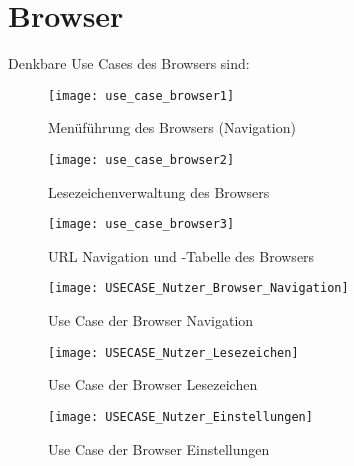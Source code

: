 \author{Gottfried von Recum}

\section{Browser}

Denkbare Use Cases des Browsers sind:
\begin{figure}[h]
	\centering
	\texttt{[image: use\_case\_browser1]}
	\caption{Menüführung des Browsers (Navigation)}
	\label{fig:Browser Navigation}
\end{figure}
\begin{figure}[h]
	\centering
	\texttt{[image: use\_case\_browser2]}
	\caption{Lesezeichenverwaltung des Browsers}
	\label{fig:Browser Lesezeichen}
\end{figure}
\begin{figure}[h]
	\centering
	\texttt{[image: use\_case\_browser3]}
	\caption{URL Navigation und \SECH-Tabelle des Browsers}
	\label{fig:Browser URL}
\end{figure}
\pagebreak

\begin{figure}[h]
	\centering
	\texttt{[image: USECASE\_Nutzer\_Browser\_Navigation]}
	\caption{Use Case der Browser Navigation}
	\label{fig:Browser Navigation Use-Case}
\end{figure}
\pagebreak

\begin{figure}[h]
	\centering
	\texttt{[image: USECASE\_Nutzer\_Lesezeichen]}
	\caption{Use Case der Browser Lesezeichen}
	\label{fig:Browser Lesezeichen Use-Case}
\end{figure}
\pagebreak

\begin{figure}[h]
	\centering
	\texttt{[image: USECASE\_Nutzer\_Einstellungen]}
	\caption{Use Case der Browser Einstellungen}
	\label{fig:Browser Einstellungen Use-Case}
\end{figure}
\pagebreak